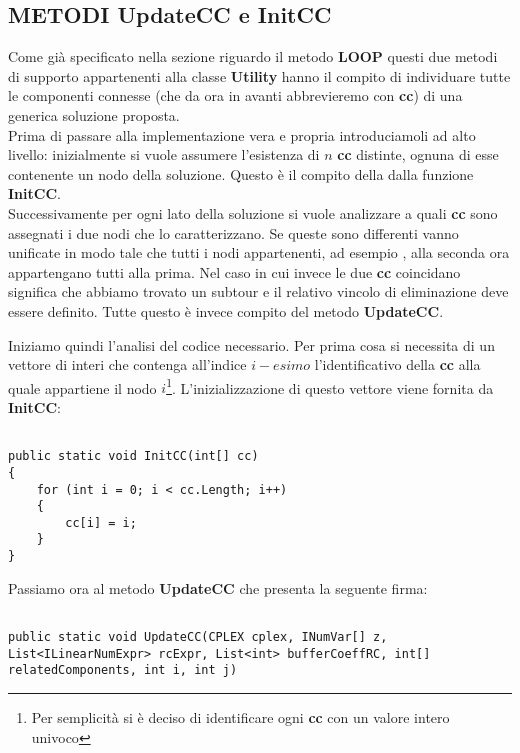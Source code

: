 \documentclass[11pt]{article}
\begin{document}
\subsection*{METODI UpdateCC e InitCC}
\label{sec:UCCICCS}

Come già specificato nella sezione riguardo il metodo \textbf{LOOP} questi due metodi di supporto appartenenti alla classe \textbf{Utility} hanno il compito di individuare tutte le componenti connesse (che da ora in avanti abbrevieremo con \textbf{cc}) di una generica soluzione proposta.\\
Prima di passare alla implementazione vera e propria introduciamoli ad alto livello: inizialmente si vuole assumere l'esistenza di $n$ \textbf{cc} distinte, ognuna di esse contenente un nodo della soluzione. Questo è il compito della dalla funzione \textbf{InitCC}.\\
Successivamente per ogni lato della soluzione si vuole analizzare a quali \textbf{cc} sono assegnati i due nodi che lo caratterizzano. Se queste sono differenti vanno unificate in modo tale che tutti i nodi appartenenti, ad esempio
, alla seconda ora appartengano tutti alla prima. Nel caso in cui invece le due \textbf{cc} coincidano significa che abbiamo trovato un subtour e il relativo vincolo di eliminazione deve essere definito. Tutte questo è invece compito del metodo \textbf{UpdateCC}.

Iniziamo quindi l'analisi del codice necessario. Per prima cosa si necessita di un vettore di interi che contenga all'indice $i-esimo$ l'identificativo della \textbf{cc} alla quale appartiene il nodo $i$\footnote{Per semplicità si è deciso di identificare ogni \textbf{cc} con un valore intero univoco}. L'inizializzazione di questo vettore viene fornita da \textbf{InitCC}:

\begin{lstlisting}

public static void InitCC(int[] cc)
{
    for (int i = 0; i < cc.Length; i++)
    {
        cc[i] = i;
    }
}

\end{lstlisting}

Passiamo ora al metodo \textbf{UpdateCC} che presenta la seguente firma:

\begin{lstlisting}

public static void UpdateCC(CPLEX cplex, INumVar[] z, List<ILinearNumExpr> rcExpr, List<int> bufferCoeffRC, int[] relatedComponents, int i, int j)

\end{lstlisting}
\end{document}
